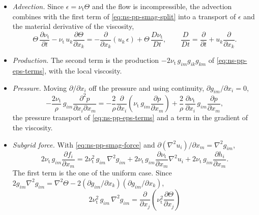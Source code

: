 \documentclass{article}
\begin{document}
\begin{itemize}
  \item \emph{Advection.} Since $\epsilon = \nu_{\mathrm{t}} \Theta$ and the
  flow is incompressible, the advection combines with the first term of
  \eqref{eq:ns-pp-smag-split} into a transport of $\epsilon$ and the material
  derivative of the viscosity,
  \begin{equation*}
    \Theta\, \frac{\partial \nu_{\mathrm{t}}}{\partial t}
    - \nu_{\mathrm{t}}\, u_k \frac{\partial \Theta}{\partial x_k}
    = - \frac{\partial}{\partial x_k}\left( u_k\, \epsilon \right)
    + \Theta\, \frac{D \nu_{\mathrm{t}}}{D t} ,
    \qquad
    \frac{D}{D t} = \frac{\partial}{\partial t} + u_k \frac{\partial}{\partial x_k} .
  \end{equation*}
  \item \emph{Production.} The second term is the production
  $-2\nu_{\mathrm{t}}\, g_{im} g_{ik} g_{km}$ of \eqref{eq:ns-pp-eps-terms},
  with the local viscosity.
  \item \emph{Pressure.} Moving $\partial/\partial x_i$ off the pressure and
  using continuity, $\partial g_{im}/\partial x_i = 0$,
  \begin{equation*}
    - \frac{2 \nu_{\mathrm{t}}}{\rho}\, g_{im} \frac{\partial^2 p}{\partial x_i \partial x_m}
    = - \frac{2}{\rho} \frac{\partial}{\partial x_i}\left( \nu_{\mathrm{t}}\, g_{im} \frac{\partial p}{\partial x_m} \right)
    + \frac{2}{\rho}\, \frac{\partial \nu_{\mathrm{t}}}{\partial x_i}\, g_{im} \frac{\partial p}{\partial x_m} ,
  \end{equation*}
  the pressure transport of \eqref{eq:ns-pp-eps-terms} and a term in the
  gradient of the viscosity.
  \item \emph{Subgrid force.} With \eqref{eq:ns-pp-smag-force} and
  $\partial (\nabla^2 u_i)/\partial x_m = \nabla^2 g_{im}$,
  \begin{equation*}
    2 \nu_{\mathrm{t}}\, g_{im} \frac{\partial f_i}{\partial x_m}
    = 2 \nu_{\mathrm{t}}^2\, g_{im}\, \nabla^2 g_{im}
    + 2 \nu_{\mathrm{t}}\, g_{im} \frac{\partial \nu_{\mathrm{t}}}{\partial x_m} \nabla^2 u_i
    + 2 \nu_{\mathrm{t}}\, g_{im} \frac{\partial h_i}{\partial x_m} .
  \end{equation*}
  The first term is the one of the uniform case. Since
  $2 g_{im} \nabla^2 g_{im} = \nabla^2 \Theta - 2 (\partial g_{im}/\partial x_k)(\partial g_{im}/\partial x_k)$,
  \begin{equation*}
    2 \nu_{\mathrm{t}}^2\, g_{im}\, \nabla^2 g_{im}
    = \frac{\partial}{\partial x_j}\left( \nu_{\mathrm{t}}^2 \frac{\partial \Theta}{\partial x_j} \right)

\end{equation*}
\end{itemize}
\end{document}
